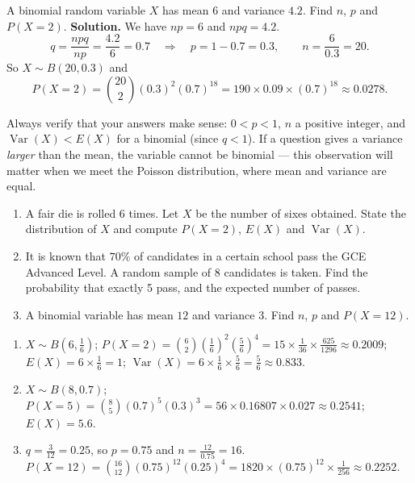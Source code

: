 \documentclass[11pt]{article}
\begin{document}
\begin{exoresolu}
A binomial random variable $X$ has mean $6$ and variance $4.2$. Find $n$, $p$ and $P(X = 2)$.
\tcblower
\textbf{Solution.} We have $np = 6$ and $npq = 4.2$.
\[
q = \frac{npq}{np} = \frac{4.2}{6} = 0.7 \quad\Longrightarrow\quad p = 1 - 0.7 = 0.3, \qquad n = \frac{6}{0.3} = 20.
\]
So $X \sim B(20, 0.3)$ and
\[
P(X = 2) = \binom{20}{2}(0.3)^2(0.7)^{18} = 190 \times 0.09 \times (0.7)^{18} \approx 0.0278.
\]
\end{exoresolu}

\begin{attention}
Always verify that your answers make sense: $0 < p < 1$, $n$ a positive integer, and $\operatorname{Var}(X) < E(X)$ for a binomial (since $q < 1$). If a question gives a variance \emph{larger} than the mean, the variable cannot be binomial — this observation will matter when we meet the Poisson distribution, where mean and variance are equal.
\end{attention}

\begin{exercice}
\begin{enumerate}
\item A fair die is rolled 6 times. Let $X$ be the number of sixes obtained. State the distribution of $X$ and compute $P(X = 2)$, $E(X)$ and $\operatorname{Var}(X)$.
\item It is known that $70\%$ of candidates in a certain school pass the GCE Advanced Level. A random sample of 8 candidates is taken. Find the probability that exactly 5 pass, and the expected number of passes.
\item A binomial variable has mean $12$ and variance $3$. Find $n$, $p$ and $P(X = 12)$.
\end{enumerate}
\end{exercice}

\begin{corrige}[Exercise 1]
\begin{enumerate}
\item $X \sim B(6, \tfrac16)$; $P(X=2) = \binom{6}{2}\left(\tfrac16\right)^2\left(\tfrac56\right)^4 = 15 \times \tfrac{1}{36} \times \tfrac{625}{1296} \approx 0.2009$; $E(X) = 6 \times \tfrac16 = 1$; $\operatorname{Var}(X) = 6 \times \tfrac16 \times \tfrac56 = \tfrac56 \approx 0.833$.
\item $X \sim B(8, 0.7)$; $P(X=5) = \binom{8}{5}(0.7)^5(0.3)^3 = 56 \times 0.16807 \times 0.027 \approx 0.2541$; $E(X) = 5.6$.
\item $q = \tfrac{3}{12} = 0.25$, so $p = 0.75$ and $n = \tfrac{12}{0.75} = 16$. $P(X=12) = \binom{16}{12}(0.75)^{12}(0.25)^4 = 1820 \times (0.75)^{12} \times \tfrac{1}{256} \approx 0.2252$.
\end{enumerate}
\end{corrige}
\end{document}

